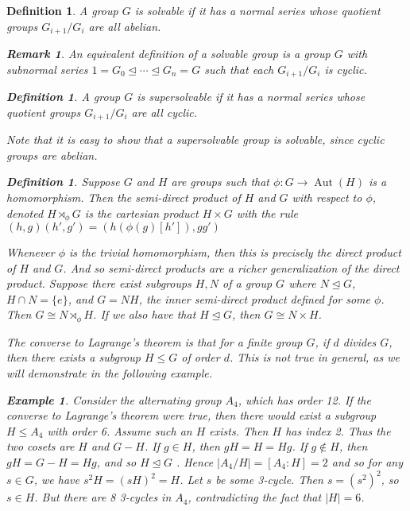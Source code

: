 \documentclass[12pt]{report}
\theoremstyle{newthm}
\newtheorem{Definition}[lem]{Definition}
\newtheorem{Example}[lem]{Example}
\newtheorem{Remark}[lem]{Remark}
\DeclareMathOperator{\Aut}{Aut}
\begin{document}
\begin{Definition} A group $G$ is \textit{solvable} if it has a normal series whose quotient groups $G_{i+1}/G_i$ are all abelian.

\begin{Remark}An equivalent definition of a solvable group is a group $G$ with subnormal series $1=G_0\trianglelefteq\dotsi\trianglelefteq G_n=G$ such that each $G_{i+1}/G_i$ is cyclic.
\end{Remark}

\begin{Definition}
A group $G$ is \textit{supersolvable} if it has a normal series whose quotient groups $G_{i+1}/G_i$ are all cyclic.
\end{Definition}

Note that it is easy to show that a supersolvable group is solvable, since cyclic groups are abelian.

\begin{Definition}
Suppose $G$ and $H$ are groups such that $\phi:G\rightarrow \Aut(H)$ is a homomorphism. Then the \textit{semi-direct product} of $H$ and $G$ with respect to $\phi$, denoted $H\rtimes_\phi G$ is the cartesian product $H\times G$ with the rule $(h,g)(h',g')=(h(\phi(g)[h']),gg')$
\end{Definition}

Whenever $\phi$ is the trivial homomorphism, then this is precisely the direct product of $H$ and $G$. And so semi-direct products are a richer generalization of the direct product. Suppose there exist subgroups $H, N$ of a group $G$ where $N\trianglelefteq G$, $H\cap N=\{e\}$, and $G = NH$, the inner semi-direct product defined for some $\phi$. Then $G\cong N\rtimes_\phi H$. If we also have that $H\trianglelefteq G$, then $G\cong N\times H$.

\par The converse to Lagrange's theorem is that for a finite group $G$, if $d$ divides $G$, then there exists a subgroup $H\leq G$ of order $d$. This is not true in general, as we will demonstrate in the following example.

\begin{Example}\label{A4}   
Consider the alternating group $A_4$, which has order 12. If the converse to Lagrange's theorem were true, then there would exist a subgroup $H\leq A_4$ with order 6. Assume such an $H$ exists. Then $H$ has index 2. Thus the two cosets are $H$ and $G-H$. If $g\in H$, then $gH=H=Hg$. If $g\not\in H$, then $gH=G-H=Hg$, and so $H\trianglelefteq G$ . Hence $|A_4/H|=[A_4:H]=2$ and so for any $s\in G$, we have $s^2H=(sH)^2 = H$. Let $s$ be some 3-cycle. Then $s=(s^2)^2$, so $s\in H$. But there are 8 3-cycles in $A_4$, contradicting the fact that $|H|=6$.
\end{Example}


\end{Definition}
\end{document}
